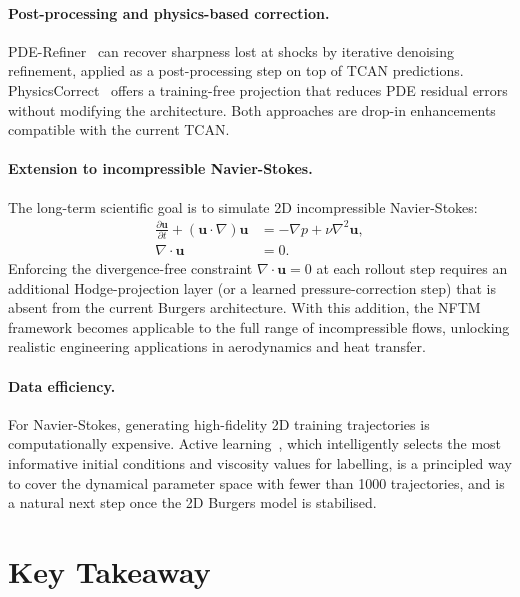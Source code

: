 \paragraph{Post-processing and physics-based correction.}
PDE-Refiner~\cite{lippe2023pderefiner} can recover sharpness lost at shocks by iterative denoising refinement, applied as a post-processing step on top of TCAN predictions. PhysicsCorrect~\cite{huang2025physicscorrect} offers a training-free projection that reduces PDE residual errors without modifying the architecture. Both approaches are drop-in enhancements compatible with the current TCAN.

\paragraph{Extension to incompressible Navier-Stokes.}
The long-term scientific goal is to simulate 2D incompressible Navier-Stokes:
\begin{align}
  \frac{\partial \mathbf{u}}{\partial t} + (\mathbf{u} \cdot \nabla)\mathbf{u}
  &= -\nabla p + \nu \nabla^2 \mathbf{u}, \\
  \nabla \cdot \mathbf{u} &= 0.
\end{align}
Enforcing the divergence-free constraint $\nabla \cdot \mathbf{u} = 0$ at each rollout step requires an additional Hodge-projection layer (or a learned pressure-correction step) that is absent from the current Burgers architecture. With this addition, the NFTM framework becomes applicable to the full range of incompressible flows, unlocking realistic engineering applications in aerodynamics and heat transfer.

\paragraph{Data efficiency.}
For Navier-Stokes, generating high-fidelity 2D training trajectories is computationally expensive. Active learning~\cite{musekamp2025activelearning}, which intelligently selects the most informative initial conditions and viscosity values for labelling, is a principled way to cover the dynamical parameter space with fewer than 1000 trajectories, and is a natural next step once the 2D Burgers model is stabilised.

\section{Key Takeaway}
\label{sec:conclusion_takeaway}


